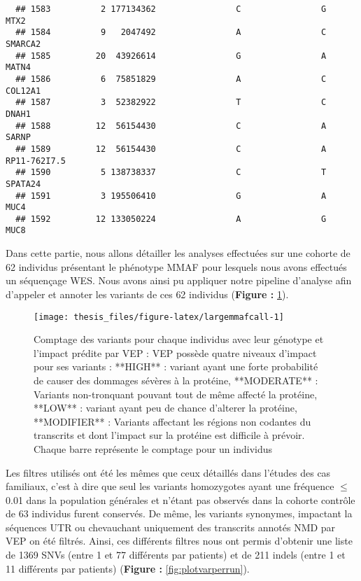 \documentclass[12pt,twoside]{reedthesis}
\theoremstyle{definition}
\theoremstyle{definition}
\theoremstyle{remark}
\begin{document}
\begin{verbatim}
  ## 1583          2 177134362                C                G           MTX2
  ## 1584          9   2047492                A                C        SMARCA2
  ## 1585         20  43926614                G                A          MATN4
  ## 1586          6  75851829                A                C        COL12A1
  ## 1587          3  52382922                T                C          DNAH1
  ## 1588         12  56154430                C                A          SARNP
  ## 1589         12  56154430                C                A   RP11-762I7.5
  ## 1590          5 138738337                C                T        SPATA24
  ## 1591          3 195506410                G                A           MUC4
  ## 1592         12 133050224                A                G           MUC8
  \end{verbatim}
  
  Dans cette partie, nous allons détailler les analyses effectuées sur une
  cohorte de 62 individus présentant le phénotype MMAF pour lesquels nous
  avons effectués un séquençage WES. Nous avons ainsi pu appliquer notre
  pipeline d'analyse afin d'appeler et annoter les variants de ces 62
  individus (\textbf{Figure : }\ref{fig:largemmafcall}).
  
  \begin{figure}
  
  {\centering \texttt{[image: thesis\_files/figure-latex/largemmafcall-1]} 
  
  }
  
  \caption[Comptage des variants pour chaque individus avec leur génotype et l'impact prédite par VEP]{Comptage des variants pour chaque individus avec leur génotype et l'impact prédite par VEP  :  VEP possède quatre niveaux d'impact pour ses variants : **HIGH** : variant ayant une forte probabilité de causer des dommages sévères à la protéine, **MODERATE** : Variants non-tronquant pouvant tout de même affecté la protéine, **LOW** : variant ayant peu de chance d'alterer la protéine, **MODIFIER** :  Variants affectant les régions non codantes du transcrits et dont l'impact sur la protéine est difficile à prévoir. Chaque barre représente le comptage pour un individus}\label{fig:largemmafcall}
  \end{figure}
  
  Les filtres utilisés ont été les mêmes que ceux détaillés dans l'études
  des cas familiaux, c'est à dire que seul les variants homozygotes ayant
  une fréquence \(\le\) 0.01 dans la population générales et n'étant pas
  observés dans la cohorte contrôle de 63 individus furent conservés. De
  même, les variants synonymes, impactant la séquences UTR ou chevauchant
  uniquement des transcrits annotés NMD par VEP on été filtrés. Ainsi, ces
  différents filtres nous ont permis d'obtenir une liste de 1369 SNVs
  (entre 1 et 77 différents par patients) et de 211 indels (entre 1 et 11
  différents par patients) (\textbf{Figure : }\ref{fig:plotvarperrun}).
  
\end{document}
